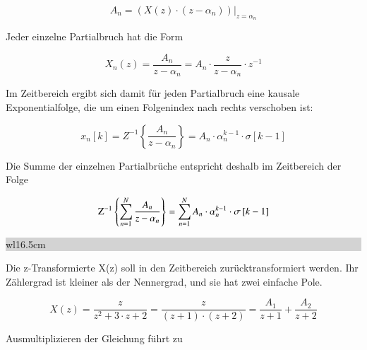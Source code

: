 \begin{equation}\label{eq:fiveninetytwo}
A_{n} =\left. \left(X\left(z\right)\cdot \left(z-\alpha _{n} \right)\right)\right|_{z=\alpha _{n} }
\end{equation}

\noindent Jeder einzelne Partialbruch hat die Form 

\begin{equation}\label{eq:fiveninetythree}
X_{n} \left(z\right)=\frac{A_{n} }{z-\alpha _{n} } =A_{n} \cdot \frac{z}{z-\alpha _{n} } \cdot z^{-1}
\end{equation}

\noindent Im Zeitbereich ergibt sich damit f\"{u}r jeden Partialbruch eine kausale Exponentialfolge, die um einen Folgenindex nach rechts verschoben ist:

\begin{equation}\label{eq:fiveninetyfour}
x_{n} \left[k\right]=Z^{-1} \left\{\frac{A_{n} }{z-\alpha _{n} } \right\}=A_{n} \cdot \alpha _{n}^{k-1} \cdot \sigma \left[k-1\right]
\end{equation}

\noindent Die Summe der einzelnen Partialbr\"{u}che entspricht deshalb im Zeitbereich der Folge

\begin{equation}\label{eq:fiveninetyfive}
{\rm Z}^{-1} \left\{\sum _{n=1}^{N}\frac{A_{n} }{z-\alpha _{n} }  \right\}=\sum _{n=1}^{N}A_{n} \cdot \alpha _{n}^{k-1} \cdot \sigma \left[k-1\right]
\end{equation}

\noindent
\colorbox{lightgray}{%
%
\renewcommand\arraystretch{0.6}%
\begin{tabular}{ wl{16.5cm} }
{}
\end{tabular}%
}\medskip

\noindent Die z-Transformierte X(z) soll in den Zeitbereich zur\"{u}cktransformiert werden. Ihr Z\"{a}hlergrad ist kleiner als der Nennergrad, und sie hat zwei einfache Pole. 

\begin{equation}\label{eq:fiveninetysix}
X\left(z\right)=\frac{z}{z^{2} +3\cdot z+2} =\frac{z}{\left(z+1\right)\cdot \left(z+2\right)} =\frac{A_{1} }{z+1} +\frac{A_{2} }{z+2}
\end{equation}

\noindent Ausmultiplizieren der Gleichung f\"{u}hrt zu

